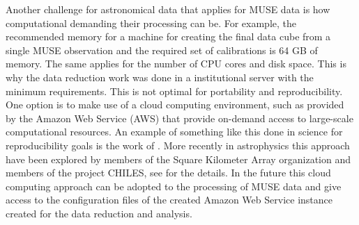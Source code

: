 Another challenge for astronomical data that applies for MUSE data is how computational demanding their processing can be. For example, the recommended memory for a machine for creating the final data cube from a single MUSE observation and the required set of calibrations is 64 GB of memory. The same applies for the number of CPU cores and disk space. This is why the data reduction work was done in a institutional server with the minimum requirements. This is not optimal for portability and reproducibility. One option is to make use of a cloud computing environment, such as provided by the Amazon Web Service (AWS) that provide on-demand access to large-scale computational resources. An example of something like this done in science for reproducibility goals is the work of \cite{ragan-kelley_collaborative_2013}. More recently in astrophysics this approach have been explored by members of the Square Kilometer Array organization and members of the project CHILES, see \cite{Dodson_SKAAmazon_2016} for the details. In the future this cloud computing approach can be adopted to the processing of MUSE data and give access to the configuration files of the created Amazon Web Service instance created for the data reduction and analysis.  

